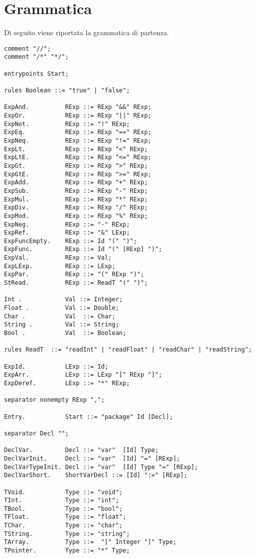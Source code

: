 \documentclass[12pt]{article}
\begin{document}
\section{Grammatica}
Di seguito viene riportata la grammatica di partenza.
\begin{verbatim}
comment "//";
comment "/*" "*/";

entrypoints Start;

rules Boolean ::= "true" | "false";

ExpAnd.          RExp ::= RExp "&&" RExp;
ExpOr.           RExp ::= RExp "||" RExp;
ExpNot.          RExp ::= "!" RExp; 
ExpEq.           RExp ::= RExp "==" RExp;
ExpNeq.          RExp ::= RExp "!=" RExp;
ExpLt.           RExp ::= RExp "<" RExp;
ExpLtE.          RExp ::= RExp "<=" RExp;
ExpGt.           RExp ::= RExp ">" RExp;
ExpGtE.          RExp ::= RExp ">=" RExp;
ExpAdd.          RExp ::= RExp "+" RExp;
ExpSub.          RExp ::= RExp "-" RExp;
ExpMul.          RExp ::= RExp "*" RExp;
ExpDiv.          RExp ::= RExp "/" RExp;
ExpMod.          RExp ::= RExp "%" RExp;
ExpNeg.          RExp ::= "-" RExp;
ExpRef.          RExp ::= "&" LExp;
ExpFuncEmpty.    RExp ::= Id "(" ")";
ExpFunc.         RExp ::= Id "(" [RExp] ")";
ExpVal.          RExp ::= Val;
ExpLExp.         RExp ::= LExp;
ExpPar.          RExp ::= "(" RExp ")";
StRead.          RExp ::= ReadT "(" ")";

Int .            Val ::= Integer;
Float .          Val ::= Double;
Char .           Val  ::= Char;
String .         Val ::= String;
Bool .           Val  ::= Boolean;

rules ReadT  ::= "readInt" | "readFloat" | "readChar" | "readString";

ExpId.           LExp ::= Id;
ExpArr.          LExp ::= LExp "[" RExp "]";
ExpDeref.        LExp ::= "*" RExp;

separator nonempty RExp ",";

Entry.           Start ::= "package" Id [Decl];

separator Decl "";

DeclVar.         Decl ::= "var"  [Id] Type;
DeclVarInit.     Decl ::= "var"  [Id] "=" [RExp];
DeclVarTypeInit. Decl ::= "var"  [Id] Type "=" [RExp];
DeclVarShort.    ShortVarDecl ::= [Id] ":=" [RExp];

TVoid.           Type ::= "void";
TInt.            Type ::= "int";
TBool.           Type ::= "bool";
TFloat.          Type ::= "float";
TChar.           Type ::= "char";
TString.         Type ::= "string";
TArray.          Type ::=  "[" Integer "]" Type; 
TPointer.        Type ::= "*" Type; 


\end{verbatim}
\end{document}
